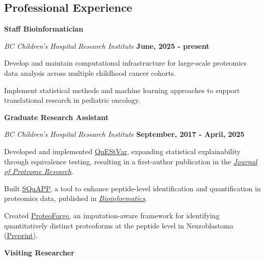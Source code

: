 \documentclass[margin,line]{res}
\begin{document}
\begin{resume}
\section{\sc Professional Experience}

{\bf Staff Bioinformatician}

\vspace{-.3cm}
{\em BC Children's Hospital Research Institute} \hfill {\bf June, 2025 - present}\\
\vspace{-.3cm}
\begin{list2}
\item Develop and maintain computational infrastructure for large-scale proteomics data analysis across multiple childhood cancer cohorts.
\item Implement statistical methods and machine learning approaches to support translational research in pediatric oncology.
\end{list2}

{\bf Graduate Research Assistant}

\vspace{-.3cm}
{\em BC Children's Hospital Research Institute} \hfill {\bf September, 2017 - April, 2025}\\
\vspace{-.3cm}
\begin{list2}
\item Developed and implemented \href{https://github.com/LangeLab/Analysis_of_QuEStVar_Manuscript}{QuEStVar}, expanding statistical explainability through equivalence testing, resulting in a first-author publication in the \href{https://doi.org/10.1021/acs.jproteome.4c00131}{\emph{Journal of Proteome Research}}.
\item Built \href{https://github.com/LangeLab/SQuAPP}{SQuAPP}, a tool to enhance peptide-level identification and quantification in proteomics data, published in \href{https://doi.org/10.1093/bioinformatics/btac628}{\emph{Bioinformatics}}.
\item Created \href{https://github.com/LangeLab/ProteoForge_Analysis}{ProteoForge}, an imputation-aware framework for identifying quantitatively distinct proteoforms at the peptide level in Neuroblastoma (\href{https://www.biorxiv.org/content/10.64898/2025.12.12.694008}{Preprint}).
\end{list2}

{\bf Visiting Researcher}


\end{resume}
\end{document}

